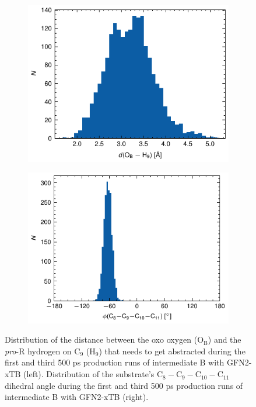 \begin{figure}[htbp]
    \centering
    \begin{subfigure}{.49\textwidth}
        \centering
        \includegraphics{Figures/xtb_Ob-H9_hist.pdf}
    \end{subfigure}
    \begin{subfigure}{.49\textwidth}
        \centering
        \includegraphics{Figures/xtb_C9-C10_hist.pdf}
    \end{subfigure}
    \caption{Distribution of the distance between the oxo oxygen (O$_{\text{B}}$) and the \textit{pro}-R hydrogen on C$_{9}$ (H$_{9}$) that needs to get abstracted during the first and third 500 ps production runs of intermediate B with GFN2-xTB (left). Distribution of the substrate's C$_8-$C$_9-$C$_{10}-$C$_{11}$ dihedral angle during the first and third 500 ps production runs of intermediate B with GFN2-xTB (right).}
    \label{fig:xtb_production}
\end{figure}


